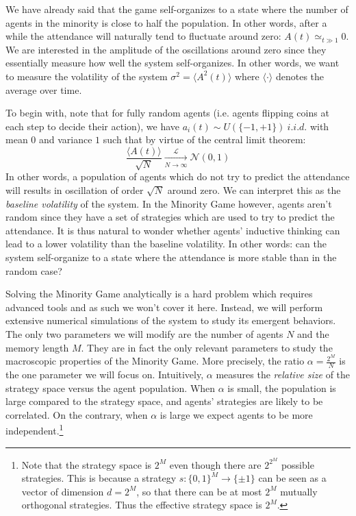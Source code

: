 \documentclass[a4paper, amsfonts, amssymb, amsmath, reprint, showkeys, nofootinbib, twoside]{revtex4-1}
\begin{document}
We have already said that the game self-organizes to a state where the number of agents in the minority is close to half the population. In other words, after a while the attendance will naturally tend to fluctuate around zero: $A(t) \simeq_{t \gg 1} 0$. We are interested in the amplitude of the oscillations around zero since they essentially measure how well the system self-organizes. In other words, we want to measure the volatility of the system $\sigma^2 = \langle A^2(t) \rangle$ where $\langle \cdot \rangle$ denotes the average over time.

To begin with, note that for fully random agents (i.e. agents flipping coins at each step to decide their action), we have $a_i(t) \sim U(\{-1, +1\}) \ i.i.d.$ with mean $0$ and variance $1$ such that by virtue of the central limit theorem:
\begin{equation}
    \frac{\langle A(t) \rangle}{\sqrt{N}} \xrightarrow[N \to \infty]{\mathcal{L}} \mathcal{N}(0, 1)
\end{equation}
In other words, a population of agents which do not try to predict the attendance will results in oscillation of order $\sqrt{N}$ around zero. We can interpret this as the \textit{baseline volatility} of the system. In the Minority Game however, agents aren't random since they have a set of strategies which are used to try to predict the attendance. It is thus natural to wonder whether agents' inductive thinking can lead to a lower volatility than the baseline volatility. In other words: can the system self-organize to a state where the attendance is more stable than in the random case?

Solving the Minority Game analytically is a hard problem which requires advanced tools and as such we won't cover it here. Instead, we will perform extensive numerical simulations of the system to study its emergent behaviors. The only two parameters we will modify are the number of agents $N$ and the memory length $M$. They are in fact the only relevant parameters to study the macroscopic properties of the Minority Game. More precisely, the ratio $\alpha = \frac{2^M}{N}$ is the one parameter we will focus on. Intuitively, $\alpha$ measures the \textit{relative size} of the strategy space versus the agent population. When $\alpha$ is small, the population is large compared to the strategy space, and agents' strategies are likely to be correlated. On the contrary, when $\alpha$ is large we expect agents to be more independent.\footnote{Note that the strategy space is $2^M$ even though there are $2^{2^M}$ possible strategies. This is because a strategy $s:\{0, 1\}^M \to \{\pm 1\}$ can be seen as a vector of dimension $d=2^M$, so that there can be at most $2^M$ mutually orthogonal strategies. Thus the effective strategy space is $2^M$.}
\end{document}
